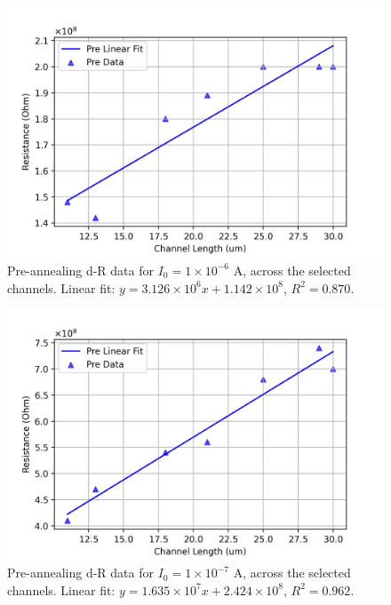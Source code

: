 \begin{figure}[H]
    \centering
    \includegraphics[width=\textwidth]{Chapter3/Figs/Raster/Sample F 2022/Pre-anneal data/1e-06A.png}
    \caption{Pre-annealing d-R data for $I_{0}=1\times10^{-6}$ \si{\ampere}, across the selected channels. Linear fit: $y = 3.126\times10^{6}x + 1.142\times10^{8}$, $R^{2}=0.870$.}
    \label{fig:pre-anneal-dr-1e-6}
\end{figure}
\begin{figure}[H]
    \centering
    \includegraphics[width=\textwidth]{Chapter3/Figs/Raster/Sample F 2022/Pre-anneal data/1e-07A.png}
    \caption{Pre-annealing d-R data for $I_{0}=1\times10^{-7}$ \si{\ampere}, across the selected channels. Linear fit: $y = 1.635\times10^{7}x + 2.424\times10^{8}$, $R^{2}=0.962$.}
    \label{fig:pre-anneal-dr-1e-7}
\end{figure}
